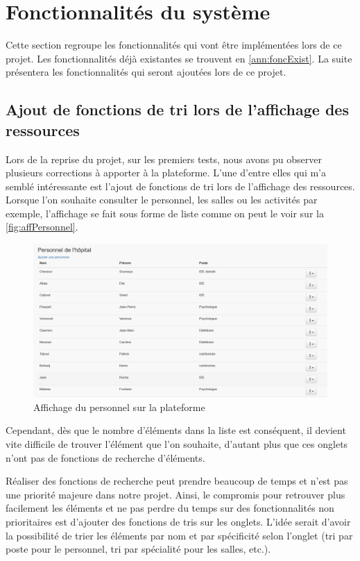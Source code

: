 \documentclass[noposter]{polytech/polytech}
\begin{document}
\section{Fonctionnalités du système}

Cette section regroupe les fonctionnalités qui vont être implémentées lors de ce projet. Les fonctionnalités déjà existantes se trouvent en \autoref{ann:foncExist}. La suite présentera les fonctionnalités qui seront ajoutées lors de ce projet. 


\subsection{Ajout de fonctions de tri lors de l'affichage des ressources}
\label{subsec:tri}

Lors de la reprise du projet, sur les premiers tests, nous avons pu observer plusieurs corrections à apporter à la plateforme. L'une d'entre elles qui m'a semblé intéressante est l'ajout de fonctions de tri lors de l'affichage des ressources. Lorsque l'on souhaite consulter le personnel, les salles ou les activités par exemple, l'affichage se fait sous forme de liste comme on peut le voir sur la \autoref{fig:affPersonnel}.

\begin{figure}
	\includegraphics[scale=0.45]{images/affichage_personnel}
	\caption{Affichage du personnel sur la plateforme}
	\label{fig:affPersonnel}
\end{figure}

Cependant, dès que le nombre d'éléments dans la liste est conséquent, il devient vite difficile de trouver l'élément que l'on souhaite, d'autant plus que ces onglets n'ont pas de fonctions de recherche d'éléments.

Réaliser des fonctions de recherche peut prendre beaucoup de temps et n'est pas une priorité majeure dans notre projet. Ainsi, le compromis pour retrouver plus facilement les éléments et ne pas perdre du temps sur des fonctionnalités non prioritaires est d'ajouter des fonctions de tris sur les onglets. L'idée serait d'avoir la possibilité de trier les éléments par nom et par spécificité selon l'onglet (tri par poste pour le personnel, tri par spécialité pour les salles, etc.).
\end{document}
